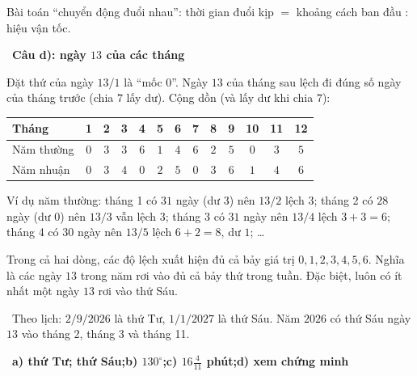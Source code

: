 \documentclass[11pt]{article}
\providecommand{\AnsWord}{Đáp số}
\newcommand{\ans}[1]{\par\smallskip{\bfseries\color{tmGreen!88!black}\AnsWord:}\ {\bfseries\color{AnsRed}#1}\par}
\newcommand{\step}[2]{\par\smallskip\noindent{\bfseries\color{tmBlue!85!black}\StepWord~#1.}\ {\bfseries #2}\par\nopagebreak}
\newcommand{\verify}[1]{\par\smallskip\noindent{\bfseries\color{tmGreen!80!black}\faCheckCircle\ \CheckWord}\ #1\par}
\def\AnsWord{Đáp số}
\def\StepWord{Bước}
\def\CheckWord{Thử lại:}
\begin{document}
{\begin{recallbox}Bài toán ``chuyển động đuổi nhau'': thời gian đuổi kịp $=$ khoảng cách ban đầu $:$ hiệu vận tốc.\end{recallbox}
\step{5}{Câu d): ngày $13$ của các tháng}
Đặt thứ của ngày $13/1$ là ``mốc $0$''. Ngày $13$ của tháng sau lệch đi đúng số ngày của tháng trước (chia $7$ lấy dư). Cộng dồn
(và lấy dư khi chia $7$):
\begin{center}\scriptsize
\setlength{\tabcolsep}{3.2pt}
\begin{tabular}{|l|c|c|c|c|c|c|c|c|c|c|c|c|}
\hline
\rowcolor{tmBlue!10} Tháng & 1 & 2 & 3 & 4 & 5 & 6 & 7 & 8 & 9 & 10 & 11 & 12\\ \hline
Năm thường & $0$ & $3$ & $3$ & $6$ & $1$ & $4$ & $6$ & $2$ & $5$ & $0$ & $3$ & $5$\\ \hline
Năm nhuận & $0$ & $3$ & $4$ & $0$ & $2$ & $5$ & $0$ & $3$ & $6$ & $1$ & $4$ & $6$\\ \hline
\end{tabular}
\end{center}
Ví dụ năm thường: tháng 1 có $31$ ngày (dư $3$) nên $13/2$ lệch $3$; tháng 2 có $28$ ngày (dư $0$) nên $13/3$ vẫn lệch $3$; tháng 3 có
$31$ ngày nên $13/4$ lệch $3 + 3 = 6$; tháng 4 có $30$ ngày nên $13/5$ lệch $6 + 2 = 8$, dư $1$; \dots
\begin{proofbox}Trong cả hai dòng, các độ lệch xuất hiện đủ cả bảy giá trị $0, 1, 2, 3, 4, 5, 6$. Nghĩa là các ngày $13$ trong năm rơi
vào đủ cả bảy thứ trong tuần. Đặc biệt, luôn có ít nhất một ngày $13$ rơi vào thứ Sáu.\end{proofbox}
\verify{Theo lịch: $2/9/2026$ là thứ Tư, $1/1/2027$ là thứ Sáu. Năm $2026$ có thứ Sáu ngày $13$ vào tháng 2, tháng 3 và tháng 11.}
\ans{a) thứ Tư; thứ Sáu;\quad b) $130^\circ$;\quad c) $16\frac{4}{11}$ phút;\quad d) xem chứng minh}
}

\end{document}
